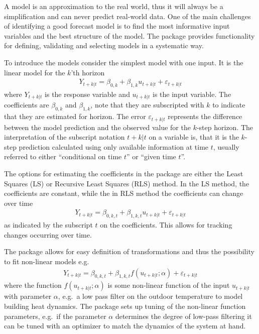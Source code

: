 A model is an approximation to the real world, thus it will always be a
simplification and can never predict real-world data. One of the main challenges of
identifying a good forecast model is to find the most informative input
variables and the best structure of the model. The \onlineforecast package
provides functionality for defining, validating and selecting models in a
systematic way.

To introduce the \onlineforecast models consider the simplest model with one
input. It is the linear model for the $k$'th horizon
\begin{align}
    Y_{t+k|t} = \beta_{0,k} + \beta_{1,k} u_{t+k|t} + \varepsilon_{t+k|t}
\end{align}
where $Y_{t+k|t}$ is the response variable and $u_{t+k|t}$ is the input
variable. The coefficients are $\beta_{0,k}$ and $\beta_{1,k}$, note that they
are subscripted with $k$ to indicate that they are estimated for
 horizon. The error $\varepsilon_{t+k|t}$
represents the difference between the model prediction and the observed value
for the $k$-step horizon. The interpretation of the subscript notation $t+k|t$
on a variable is, that it is the $k$-step prediction calculated using only
available information at time $t$, usually referred to either ``conditional on
time $t$'' or ``given time $t$''.

The options for estimating the coefficients in the package are either the Least Squares
(LS) or Recursive Least Squares (RLS) method. In the LS method, the coefficients
are constant, while the in RLS method the coefficients can change over time
\begin{align}
    Y_{t+k|t} = \beta_{0,k,t} + \beta_{1,k,t} u_{t+k|t} + \varepsilon_{t+k|t}
\end{align}
as indicated by the subscript $t$ on the coefficients. This allows for tracking
changes occurring over time.

The package allows for easy definition of transformations and thus the
  possibility to fit non-linear models e.g.
\begin{align}
    Y_{t+k|t} = \beta_{0,k,t} + \beta_{1,k,t} f(u_{t+k|t};\alpha) + \varepsilon_{t+k|t}
\end{align}
where the function $f(u_{t+k|t};\alpha)$ is some non-linear function of the
input $u_{t+k|t}$ with parameter $\alpha$, e.g.\ a low pass filter on the outdoor
temperature to model building heat dynamics. The package sets up tuning of the
non-linear function parameters, e.g.\ if the parameter $\alpha$ determines the
degree of low-pass filtering it can be tuned with an optimizer to match the
dynamics of the system at hand.

